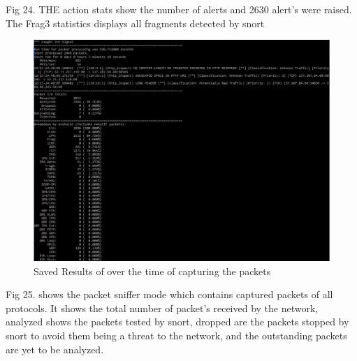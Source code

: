 \documentclass{article}
\begin{document}
Fig 24. THE action stats show the number of alerts and 2630 alert's were raised. The Frag3 statistics displays all fragments detected by snort 

\begin{figure}[H]
	\begin{center}
		\includegraphics[width=0.6
\textwidth]{Res3.jpg}
	\end{center}
	\caption{Saved Results of over the time of capturing the packets}
	\label{fig:Res3}
\end{figure}

Fig 25. shows the packet sniffer mode which contains captured packets of all protocols. It shows the total number of packet's received by the network, analyzed shows the packets tested by snort, dropped are the packets stopped by snort to avoid them being a threat to the network, and the outstanding packets are yet to be analyzed. 
\newpage
\tableofcontents
\newpage



\end{document}

